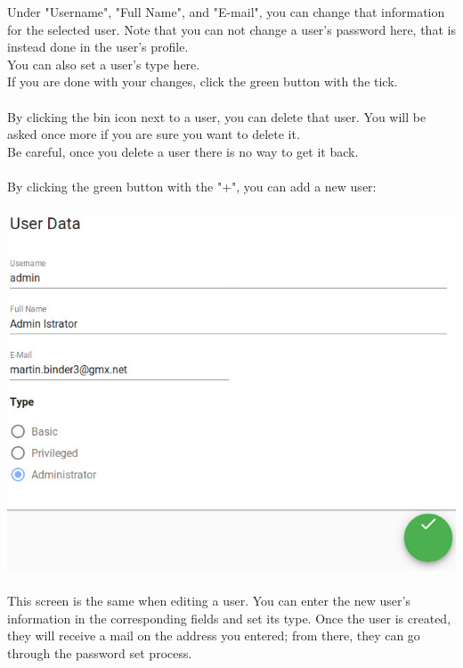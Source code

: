 \documentclass[twoside,a4paper]{refart}
\begin{document}
Under "Username", "Full Name", and "E-mail", you can change that information for the selected user. Note that you can not change a user's password here, that is instead done in the user's profile. \\
You can also set a user's type here. \\
If you are done with your changes, click the green button with the tick. \\ \\
By clicking the bin icon next to a user, you can delete that user. You will be asked once more if you are sure you want to delete it. \\
Be careful, once you delete a user there is no way to get it back. \\ \\
By clicking the green button with the "+", you can add a new user: \\ \\
\includegraphics[width=\linewidth]{useredit.jpeg} \\ \\
This screen is the same when editing a user. You can enter the new user's information in the corresponding fields and set its type. Once the user is created, they will receive a mail on the address you entered; from there, they can go through the password set process.
\end{document}
